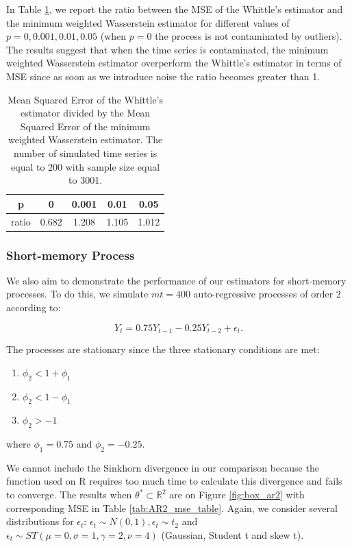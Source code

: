 \documentclass[
  11pt,
]{article}
\providecommand{\tightlist}{%
  \setlength{\itemsep}{0pt}\setlength{\parskip}{0pt}}
\begin{document}
In Table
\ref{tab:outliers}, we report the ratio between the MSE of the Whittle's
estimator and the minimum weighted Wasserstein estimator for different
values of \(p = 0, 0.001, 0.01, 0.05\) (when \(p = 0\) the process is not contaminated by outliers). The results suggest that when the time series is
contaminated, the minimum weighted Wasserstein estimator overperform the Whittle's estimator in terms of
MSE since as soon as we introduce noise the ratio becomes greater than 1.  

\begin{table}[h]
\centering
\begin{tabular}{|c|c|c|c|c|}
\hline
p  &  0  & 0.001   & 0.01    & 0.05 \\
\hline
ratio  & 0.682 & 1.208 & 1.105 & 1.012 \\
\hline
\end{tabular}
\caption{Mean Squared Error of the Whittle's estimator divided by the Mean Squared Error of the minimum weighted Wasserstein estimator. The number of simulated time series is equal to 200 with sample size equal to 3001.}
\label{tab:outliers}
\end{table}

\hypertarget{short-memory-process}{%
\subsubsection{Short-memory Process}\label{short-memory-process}}

We also aim to demonstrate the performance of our estimators for
short-memory processes. To do this, we simulate \(mt = 400\)
auto-regressive processes of order 2 according to:

\[Y_t = 0.75 Y_{t-1} - 0.25Y_{t-2} + \epsilon_t.\]

The processes are stationary since the three stationary conditions are
met:

\begin{enumerate}
\def\labelenumi{\arabic{enumi}.}
\tightlist
\item
  \(\phi_{2}<1+\phi_{1}\)
\item
  \(\phi_{2}<1-\phi_{1}\)
\item
  \(\phi_{2}>-1\)
\end{enumerate}

where \(\phi_1 = 0.75\) and \(\phi_2 = -0.25\).

We cannot include the Sinkhorn divergence in our comparison because the
function used on R requires too much time to calculate this divergence
and fails to converge. The results when
\(\theta^* \subset \mathbb{R}^2\) are on Figure \ref{fig:box_ar2} with
corresponding MSE in Table \ref{tab:AR2_mse_table}. Again, we consider
several distributions for \(\epsilon_t\):
\(\epsilon_t \sim N(0,1), \epsilon_t \sim t_2\) and
\(\epsilon_t \sim S T(\mu = 0, \sigma = 1, \gamma = 2, \nu = 4)\) (Gaussian, Student t and skew t).
\end{document}
